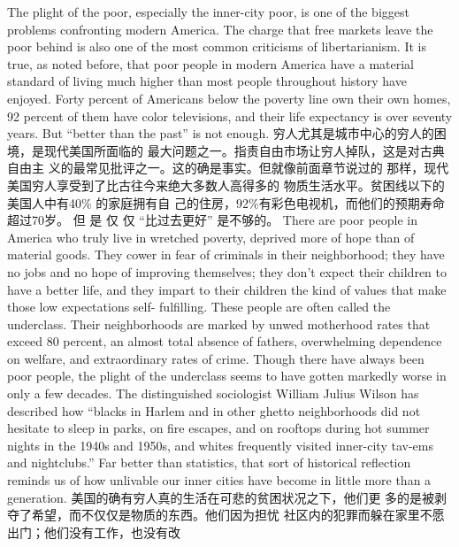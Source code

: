 \begin{paracol}{2}
The plight of the poor, especially the inner-city poor, is one of
the biggest problems confronting modern America. The charge
that free markets leave the poor behind is also one of the most
common criticisms of libertarianism. It is true, as noted before,
that poor people in modern America have a material standard
of living much higher than most people throughout history
have enjoyed. Forty percent of Americans below the poverty
line own their own homes, 92 percent of them have color televisions, and their life expectancy is over seventy years. But ``better
than the past'' is not enough.
\switchcolumn
穷人尤其是城市中心的穷人的困境，是现代美国所面临的
最大问题之一。指责自由市场让穷人掉队，这是对古典自由主
义的最常见批评之一。这的确是事实。但就像前面章节说过的
那样，现代美国穷人享受到了比古往今来绝大多数人高得多的
物质生活水平。贫困线以下的美国人中有40\% 的家庭拥有自
己的住房，92\%有彩色电视机，而他们的预期寿命超过70岁。
但 是 仅 仅 “比过去更好” 是不够的。
\switchcolumn*
There are poor people in America who truly live in wretched
poverty, deprived more of hope than of material goods. They
cower in fear of criminals in their neighborhood; they have no
jobs and no hope of improving themselves; they don't expect
their children to have a better life, and they impart to their children the kind of values that make those low expectations self-
fulfilling. These people are often called the underclass. Their
neighborhoods are marked by unwed motherhood rates that
exceed 80 percent, an almost total absence of fathers, overwhelming dependence on welfare, and extraordinary rates of
crime. Though there have always been poor people, the plight
of the underclass seems to have gotten markedly worse in only
a few decades. The distinguished sociologist William Julius
Wilson has described how ``blacks in Harlem and in other
ghetto neighborhoods did not hesitate to sleep in parks, on fire
escapes, and on rooftops during hot summer nights in the
1940s and 1950s, and whites frequently visited inner-city tav-ems and nightclubs.'' Far better than statistics, that sort of historical reflection reminds us of how unlivable our inner cities
have become in little more than a generation.
\switchcolumn
美国的确有穷人真的生活在可悲的贫困状况之下，他们更
多的是被剥夺了希望，而不仅仅是物质的东西。他们因为担忧
社区内的犯罪而躲在家里不愿出门；他们没有工作，也没有改

\end{paracol}
